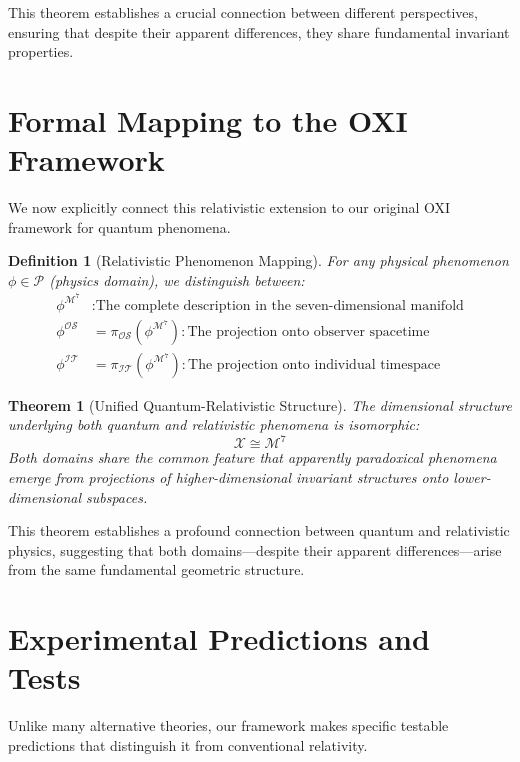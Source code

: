 \documentclass{article}
\newtheorem{definition}{Definition}
\newtheorem{theorem}{Theorem}
\begin{document}
This theorem establishes a crucial connection between different perspectives, ensuring that despite their apparent differences, they share fundamental invariant properties.

\section{Formal Mapping to the OXI Framework}

We now explicitly connect this relativistic extension to our original OXI framework for quantum phenomena.

\begin{definition}[Relativistic Phenomenon Mapping]
For any physical phenomenon $\phi \in \mathcal{P}$ (physics domain), we distinguish between:
\begin{align}
\phi^{\mathcal{M}^7} &: \text{The complete description in the seven-dimensional manifold} \\
\phi^{\mathcal{OS}} &= \pi_{\mathcal{OS}}(\phi^{\mathcal{M}^7}) : \text{The projection onto observer spacetime} \\
\phi^{\mathcal{IT}} &= \pi_{\mathcal{IT}}(\phi^{\mathcal{M}^7}) : \text{The projection onto individual timespace}
\end{align}
\end{definition}

\begin{theorem}[Unified Quantum-Relativistic Structure]
The dimensional structure underlying both quantum and relativistic phenomena is isomorphic:
\begin{equation}
\mathcal{X} \cong \mathcal{M}^7
\end{equation}
Both domains share the common feature that apparently paradoxical phenomena emerge from projections of higher-dimensional invariant structures onto lower-dimensional subspaces.
\end{theorem}

This theorem establishes a profound connection between quantum and relativistic physics, suggesting that both domains—despite their apparent differences—arise from the same fundamental geometric structure.

\section{Experimental Predictions and Tests}

Unlike many alternative theories, our framework makes specific testable predictions that distinguish it from conventional relativity.
\end{document}

